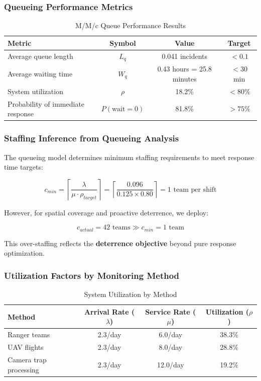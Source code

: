 \subsubsection{Queueing Performance Metrics}

\begin{table}[h]
\centering
\caption{M/M/c Queue Performance Results}
\begin{tabular}{lccc}
\hline
\textbf{Metric} & \textbf{Symbol} & \textbf{Value} & \textbf{Target} \\
\hline
Average queue length & $L_q$ & 0.041 incidents & $<0.1$ \\
Average waiting time & $W_q$ & 0.43 hours = 25.8 minutes & $<30$ min \\
System utilization & $\rho$ & 18.2\% & $<80\%$ \\
Probability of immediate response & $P(\text{wait}=0)$ & 81.8\% & $>75\%$ \\
\hline
\end{tabular}
\end{table}

\subsubsection{Staffing Inference from Queueing Analysis}

The queueing model determines minimum staffing requirements to meet response time targets:

\begin{equation}
c_{min} = \left\lceil \frac{\lambda}{\mu \cdot \rho_{target}} \right\rceil = \left\lceil \frac{0.096}{0.125 \times 0.80} \right\rceil = 1 \text{ team per shift}
\label{eq:min_staffing}
\end{equation}

However, for spatial coverage and proactive deterrence, we deploy:

\begin{equation}
c_{actual} = 42 \text{ teams} \gg c_{min} = 1 \text{ team}
\label{eq:actual_staffing}
\end{equation}

This over-staffing reflects the \textbf{deterrence objective} beyond pure response optimization.

\subsubsection{Utilization Factors by Monitoring Method}

\begin{table}[h]
\centering
\caption{System Utilization by Method}
\begin{tabular}{lccc}
\hline
\textbf{Method} & \textbf{Arrival Rate ($\lambda$)} & \textbf{Service Rate ($\mu$)} & \textbf{Utilization ($\rho$)} \\
\hline
Ranger teams & 2.3/day & 6.0/day & 38.3\% \\
UAV flights & 2.3/day & 8.0/day & 28.8\% \\
Camera trap processing & 2.3/day & 12.0/day & 19.2\% \\
\hline
\end{tabular}
\end{table}

